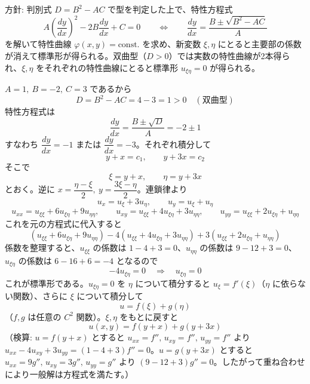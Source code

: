 
方針: 判別式 $D=B^2-AC$ で型を判定した上で、特性方程式
\[
A\left(\frac{dy}{dx}\right)^{2} - 2B\frac{dy}{dx} + C = 0
\qquad\Longleftrightarrow\qquad
\frac{dy}{dx} = \frac{B \pm \sqrt{B^{2}-AC}}{A}
\]
を解いて特性曲線 $\varphi(x,y)=\text{const.}$ を求め、新変数 $\xi,\eta$ にとると主要部の係数が消えて標準形が得られる。双曲型（$D>0$）では実数の特性曲線が2本得られ、$\xi,\eta$ をそれぞれの特性曲線にとると標準形 $u_{\xi\eta}=0$ が得られる。

$A=1,\ B=-2,\ C=3$ であるから
\[
D = B^{2}-AC = 4 - 3 = 1 > 0 \quad (\text{双曲型})
\]
特性方程式は
\[
\frac{dy}{dx} = \frac{B \pm \sqrt{D}}{A} = -2 \pm 1
\]
すなわち $\dfrac{dy}{dx} = -1$ または $\dfrac{dy}{dx} = -3$。それぞれ積分して
\[
y + x = c_1, \qquad y + 3x = c_2
\]
そこで
\[
\xi = y + x, \qquad \eta = y + 3x
\]
とおく。逆に $x = \dfrac{\eta-\xi}{2},\ y = \dfrac{3\xi-\eta}{2}$。連鎖律より
\[
u_x = u_\xi + 3u_\eta, \qquad u_y = u_\xi + u_\eta
\]
\[
u_{xx} = u_{\xi\xi} + 6u_{\xi\eta} + 9u_{\eta\eta}, \qquad
u_{xy} = u_{\xi\xi} + 4u_{\xi\eta} + 3u_{\eta\eta}, \qquad
u_{yy} = u_{\xi\xi} + 2u_{\xi\eta} + u_{\eta\eta}
\]
これを元の方程式に代入すると
\[
(u_{\xi\xi}+6u_{\xi\eta}+9u_{\eta\eta}) - 4(u_{\xi\xi}+4u_{\xi\eta}+3u_{\eta\eta}) + 3(u_{\xi\xi}+2u_{\xi\eta}+u_{\eta\eta})
\]
係数を整理すると、$u_{\xi\xi}$ の係数は $1-4+3=0$、$u_{\eta\eta}$ の係数は $9-12+3=0$、$u_{\xi\eta}$ の係数は $6-16+6=-4$ となるので
\[
-4u_{\xi\eta} = 0 \quad\Longrightarrow\quad u_{\xi\eta}=0
\]
これが標準形である。$u_{\xi\eta}=0$ を $\eta$ について積分すると $u_\xi = f'(\xi)$（$\eta$ に依らない関数）、さらに $\xi$ について積分して
\[
u = f(\xi) + g(\eta)
\]
（$f,g$ は任意の $C^2$ 関数）。$\xi,\eta$ をもとに戻すと
\[
\boxed{\; u(x,y) = f(y+x) + g(y+3x) \;}
\]
（検算: $u=f(y+x)$ とすると $u_{xx}=f'',\,u_{xy}=f'',\,u_{yy}=f''$ より $u_{xx}-4u_{xy}+3u_{yy}=(1-4+3)f''=0$。$u=g(y+3x)$ とすると $u_{xx}=9g'',\,u_{xy}=3g'',\,u_{yy}=g''$ より $(9-12+3)g''=0$。したがって重ね合わせにより一般解は方程式を満たす。）
